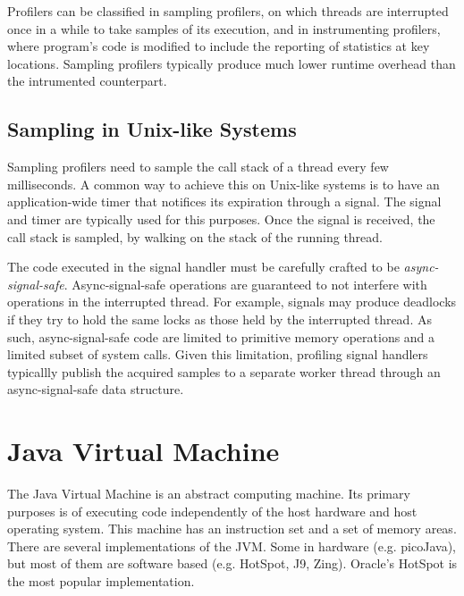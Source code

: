 Profilers can be classified in sampling profilers, on which threads are interrupted once in a while to take samples of its execution, and in instrumenting profilers, where program's code is modified to include the reporting of statistics at key locations. Sampling profilers typically produce much lower runtime overhead than the intrumented counterpart.

\subsection{Sampling in Unix-like Systems}

Sampling profilers need to sample the call stack of a thread every few milliseconds. A common way to achieve this on Unix-like systems is to have an application-wide timer that notifices its expiration through a signal. The  signal and  timer are typically used for this purposes. Once the signal is received, the call stack is sampled, by walking on the stack of the running thread.


The code executed in the signal handler must be carefully crafted to be \emph{async-signal-safe}. Async-signal-safe operations are guaranteed to not interfere with operations in the interrupted thread. For example, signals may produce deadlocks if they try to hold the same locks as those held by the interrupted thread. As such, async-signal-safe code are limited to primitive memory operations and a limited subset of system calls. Given this limitation, profiling signal handlers typicallly publish the acquired samples to a separate worker thread through an async-signal-safe data structure.


\section{Java Virtual Machine}

The Java Virtual Machine is an abstract computing machine. Its primary purposes is of executing code independently of the host hardware and host operating system. This machine has an instruction set and a set of memory areas. There are several implementations of the JVM. Some in hardware (e.g. picoJava), but most of them are software based (e.g. HotSpot, J9, Zing). Oracle's HotSpot is the most popular implementation.

